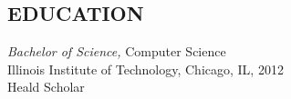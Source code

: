 \documentclass[margin]{res}
\begin{document}
\begin{resume}
\section{EDUCATION} {\sl Bachelor of Science,} Computer Science \\
                Illinois Institute of Technology, Chicago, IL,
                2012 \\
                Heald Scholar \\


\end{resume}
\end{document}
